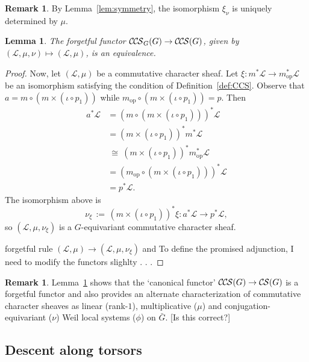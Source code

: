 \documentclass[10pt]{amsart}
\theoremstyle{plain}
\newtheorem{lemma}[theorem]{Lemma}
\theoremstyle{definition}
\newtheorem{remark}[theorem]{Remark}
\newcommand{\op}{_{\operatorname{op}}}
\newcommand{\ceq}{{\, :=\, }}
\newcommand{\iso}{{\ \cong\ }}
\newcommand{\cs}[1]{{\mathcal{#1}}}
\newcommand{\CS}{{\mathcal{C\hskip-0.8pt S}}}
\newcommand{\CCS}{{\mathcal{C\hskip-.8pt C\hskip-0.8pt S}}}
\newcommand{\bG}{\bar{G}}
\begin{document}
\begin{remark}
By Lemma~\ref{lem:symmetry}, the isomorphism $\xi_\nu$ is uniquely determined by $\mu$.
\end{remark}

\begin{lemma}\label{lem:equivariant}
The forgetful functor $\CCS_G(G)\to \CCS(G)$, given by $(\cs{L},\mu,\nu) \mapsto (\cs{L},\mu)$, is an equivalence.
\end{lemma}

\begin{proof}
Now, let $(\cs{L},\mu)$ be a commutative character sheaf.
Let $\xi: m^*\cs{L} \to m\op^*\cs{L}$ be an isomorphism satisfying the condition of Definition~\ref{def:CCS}.
Observe that $a = m \circ (m \times (\iota \circ p_1))$ while $m\op \circ (m \times (\iota \circ p_1)) = p$.
Then
\begin{align*}
a^* \cs{L} 
&= (m \circ (m \times (\iota \circ p_1)))^* \cs{L}\\
&= (m \times (\iota \circ p_1))^* m^* \cs{L}\\
&\iso (m \times (\iota \circ p_1))^* m\op^* \cs{L}\\
&= (m\op \circ (m \times (\iota \circ p_1)))^* \cs{L}\\
&= p^*\cs{L}.
\end{align*}
The isomorphism above is 
\[
\nu_\xi \ceq (m \times (\iota \circ p_1))^* \xi: a^*\cs{L} \to p^*\cs{L},
\]
 so $(\cs{L}, \mu, \nu_\xi)$ is a $G$-equivariant commutative character sheaf.

 

 forgetful  rule $(\cs{L},\mu)\to (\cs{L},\mu,\nu_\xi)$ and 
To define the promised adjunction, I need to modify the functors slighlty . . . 
\end{proof}



\begin{remark}
Lemma~\ref{lem:equivariant} shows that the `canonical functor' $\CCS(G) \to \CS(G)$ is a forgetful functor and also provides an alternate characterization of commutative character sheaves as linear (rank-$1$), multiplicative ($\mu$) and conjugation-equivariant ($\nu$) Weil local systems ($\phi$) on $\bG$. [Is this correct?]
\end{remark}


\subsection{Descent along torsors}
\end{document}
